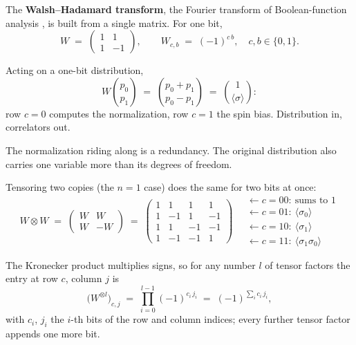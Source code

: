 \documentclass[11pt]{article}
\begin{document}
The \textbf{Walsh--Hadamard transform}, the Fourier transform of
Boolean-function analysis \cite{odonnell14}, is built from a single
matrix. For one bit,
\begin{equation}\label{eq:hadamard}
  W \;=\; \begin{pmatrix} 1 & 1 \\ 1 & -1 \end{pmatrix},
  \qquad W_{c,b} \;=\; (-1)^{c\,b}, \quad c, b \in \{0,1\}.
\end{equation}
\begin{example}
Acting on a one-bit distribution,
\[
  W \binom{p_0}{p_1}
  \;=\; \binom{p_0 + p_1}{p_0 - p_1}
  \;=\; \binom{1}{\langle \sigma \rangle}:
\]
row $c = 0$ computes the normalization, row $c = 1$ the spin bias.
Distribution in, correlators out.
\end{example}

The normalization riding along is a redundancy. The original distribution also carries one variable more than its degrees of freedom.

\begin{example}
Tensoring two copies (the $n=1$ case) does the same for two bits at once:
\begin{equation}\label{eq:HH}
  W \otimes W \;=\;
  \begin{pmatrix}
    W & W \\
    W & -W
  \end{pmatrix}
  \;=\;
  \begin{pmatrix}
    1 & 1 & 1 & 1 \\
    1 & -1 & 1 & -1 \\
    1 & 1 & -1 & -1 \\
    1 & -1 & -1 & 1
  \end{pmatrix}
  \quad
  \begin{array}{l}
    \leftarrow c = 00\colon\ \text{sums to } 1 \\
    \leftarrow c = 01\colon\ \langle \sigma_0 \rangle \\
    \leftarrow c = 10\colon\ \langle \sigma_1 \rangle \\
    \leftarrow c = 11\colon\ \langle \sigma_1 \sigma_0 \rangle
  \end{array}
\end{equation}
\end{example}

The Kronecker product multiplies signs, so for any number $l$ of
tensor factors the entry at row $c$, column $j$ is
\begin{equation}\label{eq:kron}
  \big(W^{\otimes l}\big)_{c,j}
  \;=\; \prod_{i=0}^{l-1} (-1)^{c_i\, j_i}
  \;=\; (-1)^{\sum_i c_i\, j_i},
\end{equation}
with $c_i$, $j_i$ the $i$-th bits of the row and column indices;
every further tensor factor appends one more bit.
\end{document}
